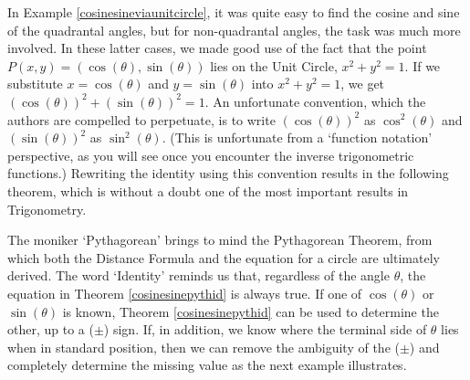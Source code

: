 \medskip



In Example \ref{cosinesineviaunitcircle},  it was quite easy to find the cosine and sine of the quadrantal angles, but for non-quadrantal angles, the task was much more involved.   In these latter cases, we made good use of the fact that the point $P(x,y) = (\cos(\theta), \sin(\theta))$ lies on the Unit Circle, $x^2+y^2 = 1$.  If we substitute  $x=\cos(\theta)$ and $y = \sin(\theta)$ into $x^2+y^2=1$, we get  $\left(\cos(\theta)\right)^2 + \left(\sin(\theta)\right)^2 = 1$.  An unfortunate convention, which the authors are compelled to perpetuate,  is to write $\left(\cos(\theta)\right)^2$ as $\cos^{2}(\theta)$ and $\left(\sin(\theta)\right)^2$ as $\sin^{2}(\theta)$. (This is unfortunate from a `function notation' perspective, as you will see once you encounter the inverse trigonometric functions.) Rewriting the identity using this convention results in the following theorem, which is without a doubt one of the most important results in Trigonometry.

\smallskip


\smallskip

The moniker `Pythagorean' brings to mind the Pythagorean Theorem, from which both the Distance Formula and the equation for a circle are ultimately derived.  The word `Identity' reminds us that, regardless of the angle $\theta$, the equation in Theorem \ref{cosinesinepythid} is always true.  If one of $\cos(\theta)$ or $\sin(\theta)$ is known, Theorem \ref{cosinesinepythid} can be used to determine the other, up to a ($\pm$) sign.  If, in addition, we know where the terminal side of $\theta$ lies when in standard position, then we can remove the ambiguity of the ($\pm$) and completely determine the missing value as the next example illustrates.

\medskip

